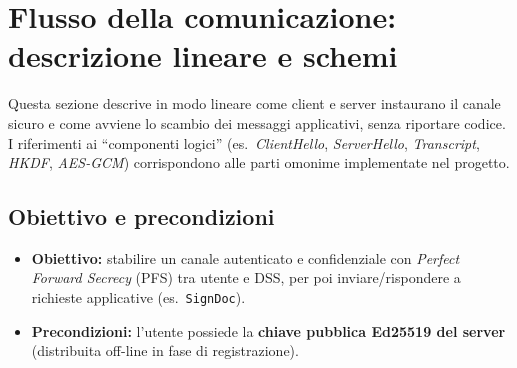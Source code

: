 
\section{Flusso della comunicazione: descrizione lineare e schemi}

Questa sezione descrive in modo lineare come client e server instaurano il canale sicuro e come avviene lo scambio dei messaggi applicativi, senza riportare codice. I riferimenti ai ``componenti logici'' (es.\ \emph{ClientHello}, \emph{ServerHello}, \emph{Transcript}, \emph{HKDF}, \emph{AES-GCM}) corrispondono alle parti omonime implementate nel progetto.

\subsection{Obiettivo e precondizioni}
\begin{itemize}
  \item \textbf{Obiettivo:} stabilire un canale autenticato e confidenziale con \emph{Perfect Forward Secrecy} (PFS) tra utente e DSS, per poi inviare/rispondere a richieste applicative (es.\ \texttt{SignDoc}).
  \item \textbf{Precondizioni:} l'utente possiede la \textbf{chiave pubblica Ed25519 del server} (distribuita off-line in fase di registrazione).
\end{itemize}


